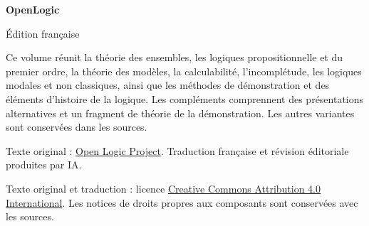 \documentclass[11pt,a4paper,openany]{memoir}
\begin{document}
\frontmatter
\begin{titlingpage}
\setlength{\parindent}{0pt}
\vspace*{15mm}
{\sffamily\Huge\bfseries OpenLogic\par}
\vspace{6mm}
{\sffamily\LARGE Édition française\par}
\vspace{14mm}
\vfill
Ce volume réunit la théorie des ensembles, les logiques propositionnelle
et du premier ordre, la théorie des modèles, la calculabilité,
l'incomplétude, les logiques modales et non classiques, ainsi que les
méthodes de démonstration et des éléments d'histoire de la logique.
Les compléments comprennent des présentations alternatives et un
fragment de théorie de la démonstration. Les autres variantes sont
conservées dans les sources.
\par\medskip
Texte original : \href{https://openlogicproject.org/}{Open Logic Project}.
Traduction française et révision éditoriale produites par IA.
\par\medskip
Texte original et traduction : licence
\href{https://creativecommons.org/licenses/by/4.0/}{Creative Commons
Attribution 4.0 International}. Les notices de droits propres aux
composants sont conservées avec les sources.
\end{titlingpage}
\tableofcontents*

\mainmatter


\backmatter
\nocite{Frege1953,Peter1967}


\end{document}
